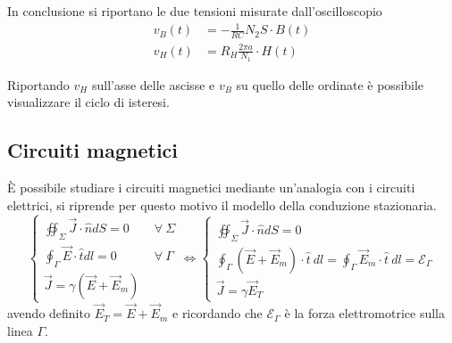 In conclusione si riportano le due tensioni misurate dall'oscilloscopio
\begin{align*}
v_B(t) &= -\frac{1}{RC}N_2 S \cdot B(t) \\
v_H(t) &= R_H \frac{2\pi a }{N_1} \cdot H(t)
\end{align*}

Riportando $v_H$ sull'asse delle ascisse e $v_B$ su quello delle ordinate è possibile
visualizzare il ciclo di isteresi.

\newpage
\subsection{Circuiti magnetici}
È possibile studiare i circuiti magnetici mediante un'analogia con i circuiti elettrici,
si riprende per questo motivo il modello della conduzione stazionaria.
$$
\begin{cases}
\oiint_\Sigma \vec{J}\cdot\hat{n} dS = 0\qquad \forall\ \Sigma\\
\oint_\Gamma \vec{E}\cdot \hat{t} dl = 0\qquad\quad \forall\ \Gamma \\
\vec{J} = \gamma\left(\vec{E}+\vec{E}_m\right)
\end{cases}
\Leftrightarrow
\begin{cases}
\oiint_\Sigma \vec{J}\cdot\hat{n} dS = 0 \\
\oint_\Gamma \left(\vec{E}+\vec{E}_m\right)\cdot\hat{t}\ dl = \oint_\Gamma \vec{E}_m\cdot\hat{t}\ dl = \mathcal{E}_\Gamma\\
\vec{J} = \gamma\vec{E}_T
\end{cases}
$$
avendo definito $\vec{E}_T = \vec{E} + \vec{E}_m$ e ricordando che $\mathcal{E}_\Gamma$ è
la forza elettromotrice sulla linea $\Gamma$.

